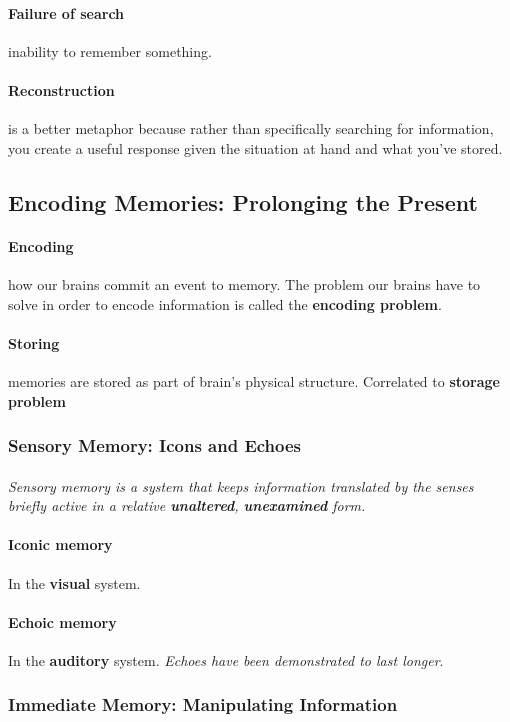 \documentclass{article}
\begin{document}
	\paragraph{Failure of search} inability to remember something.
	\paragraph{Reconstruction} is a better metaphor because rather than specifically searching for information, you create a useful response given the situation at hand and what you've stored.

	\subsection{Encoding Memories: Prolonging the Present}
	\paragraph{Encoding} how our brains commit an event to memory. The problem our brains have to solve in order to encode information is called the \textbf{encoding problem}.
	\paragraph{Storing} memories are stored as part of brain's physical structure. Correlated to \textbf{storage problem}
	\subsubsection{Sensory Memory: Icons and Echoes}
	\paragraph{} \emph{Sensory memory is a system that keeps information translated by the senses briefly active in a relative \textbf{unaltered}, \textbf{unexamined} form.}
	\paragraph{Iconic memory} In the \textbf{visual} system.
	\paragraph{Echoic memory} In the \textbf{auditory} system. \emph{Echoes have been demonstrated to last longer}.
	\subsubsection{Immediate Memory: Manipulating Information}
\end{document}
